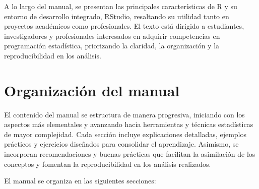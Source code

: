 \documentclass[
  spanish,
  a4paper,
  DIV=11,
  numbers=noendperiod,
  onepage,
  openany]{scrreprt}
\begin{document}
A lo largo del manual, se presentan las principales características de R
y su entorno de desarrollo integrado, RStudio, resaltando su utilidad
tanto en proyectos académicos como profesionales. El texto está dirigido
a estudiantes, investigadores y profesionales interesados en adquirir
competencias en programación estadística, priorizando la claridad, la
organización y la reproducibilidad en los análisis.

\section*{Organización del manual}\label{organizaciuxf3n-del-manual}


El contenido del manual se estructura de manera progresiva, iniciando
con los aspectos más elementales y avanzando hacia herramientas y
técnicas estadísticas de mayor complejidad. Cada sección incluye
explicaciones detalladas, ejemplos prácticos y ejercicios diseñados para
consolidar el aprendizaje. Asimismo, se incorporan recomendaciones y
buenas prácticas que facilitan la asimilación de los conceptos y
fomentan la reproducibilidad en los análisis realizados.

El manual se organiza en las siguientes secciones:
\end{document}
